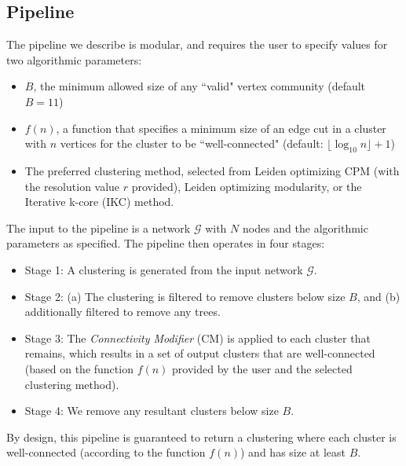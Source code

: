 \documentclass[11pt]{article}   	%
\begin{document}
\subsection{Pipeline}

The pipeline we describe is modular, and requires the user to specify values for two algorithmic parameters:
\begin{itemize}
\item $B$, the minimum allowed size of any ``valid" vertex community (default $B=11$)
\item $f(n)$, a function that specifies a minimum size of an edge cut in a cluster with $n$ vertices  for the cluster to be ``well-connected" (default: $ \lfloor \log_{10} n \rfloor +1$)
\item The preferred clustering method, selected from Leiden optimizing CPM (with the resolution value $r$ provided), Leiden optimizing modularity, or the Iterative k-core (IKC) method.
\end{itemize}

\noindent
The input to the pipeline is a network $\mathcal{G}$ with $N$ nodes and the algorithmic parameters as specified.
The pipeline then operates in four stages:
\begin{itemize}
\item
Stage 1: A clustering is generated  from the input network $\mathcal{G}$.
\item Stage 2: (a) The clustering is filtered  to remove clusters below size $B$, and (b) additionally filtered to remove any trees.
\item Stage 3: The \emph{Connectivity Modifier} (CM) is applied to each cluster that remains, which results in a set of output clusters that are well-connected (based on the function $f(n)$ provided by the user and the selected clustering method).
\item Stage 4: We remove any resultant clusters below size $B$.
\end{itemize}
By design, this pipeline is guaranteed to return a clustering where each cluster is well-connected (according to the function $f(n)$)  and has size at least $B$.
\end{document}
